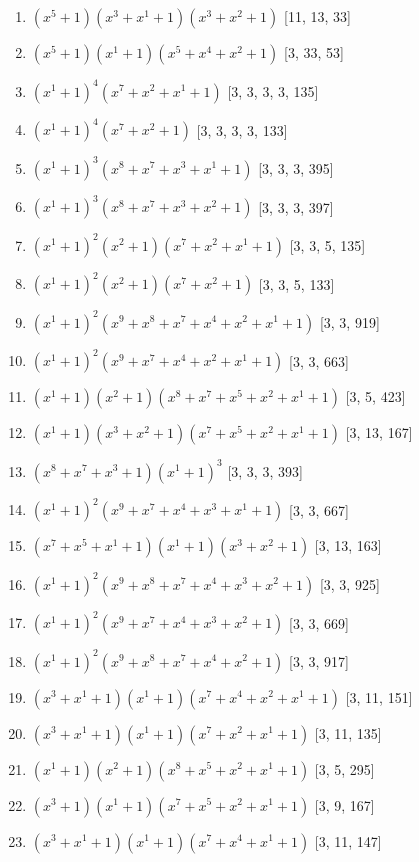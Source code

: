 \documentclass[10pt,twocolumn]{article}
\begin{document}
\begin{enumerate}
\item $(x^{5} + 1)(x^{3} + x^{1} + 1)(x^{3} + x^{2} + 1)$  [11, 13, 33]
\item $(x^{5} + 1)(x^{1} + 1)(x^{5} + x^{4} + x^{2} + 1)$  [3, 33, 53]
\item $(x^{1} + 1)^{4}(x^{7} + x^{2} + x^{1} + 1)$  [3, 3, 3, 3, 135]
\item $(x^{1} + 1)^{4}(x^{7} + x^{2} + 1)$  [3, 3, 3, 3, 133]
\item $(x^{1} + 1)^{3}(x^{8} + x^{7} + x^{3} + x^{1} + 1)$  [3, 3, 3, 395]
\item $(x^{1} + 1)^{3}(x^{8} + x^{7} + x^{3} + x^{2} + 1)$  [3, 3, 3, 397]
\item $(x^{1} + 1)^{2}(x^{2} + 1)(x^{7} + x^{2} + x^{1} + 1)$  [3, 3, 5, 135]
\item $(x^{1} + 1)^{2}(x^{2} + 1)(x^{7} + x^{2} + 1)$  [3, 3, 5, 133]
\item $(x^{1} + 1)^{2}(x^{9} + x^{8} + x^{7} + x^{4} + x^{2} + x^{1} + 1)$  [3, 3, 919]
\item $(x^{1} + 1)^{2}(x^{9} + x^{7} + x^{4} + x^{2} + x^{1} + 1)$  [3, 3, 663]
\item $(x^{1} + 1)(x^{2} + 1)(x^{8} + x^{7} + x^{5} + x^{2} + x^{1} + 1)$  [3, 5, 423]
\item $(x^{1} + 1)(x^{3} + x^{2} + 1)(x^{7} + x^{5} + x^{2} + x^{1} + 1)$  [3, 13, 167]
\item $(x^{8} + x^{7} + x^{3} + 1)(x^{1} + 1)^{3}$  [3, 3, 3, 393]
\item $(x^{1} + 1)^{2}(x^{9} + x^{7} + x^{4} + x^{3} + x^{1} + 1)$  [3, 3, 667]
\item $(x^{7} + x^{5} + x^{1} + 1)(x^{1} + 1)(x^{3} + x^{2} + 1)$  [3, 13, 163]
\item $(x^{1} + 1)^{2}(x^{9} + x^{8} + x^{7} + x^{4} + x^{3} + x^{2} + 1)$  [3, 3, 925]
\item $(x^{1} + 1)^{2}(x^{9} + x^{7} + x^{4} + x^{3} + x^{2} + 1)$  [3, 3, 669]
\item $(x^{1} + 1)^{2}(x^{9} + x^{8} + x^{7} + x^{4} + x^{2} + 1)$  [3, 3, 917]
\item $(x^{3} + x^{1} + 1)(x^{1} + 1)(x^{7} + x^{4} + x^{2} + x^{1} + 1)$  [3, 11, 151]
\item $(x^{3} + x^{1} + 1)(x^{1} + 1)(x^{7} + x^{2} + x^{1} + 1)$  [3, 11, 135]
\item $(x^{1} + 1)(x^{2} + 1)(x^{8} + x^{5} + x^{2} + x^{1} + 1)$  [3, 5, 295]
\item $(x^{3} + 1)(x^{1} + 1)(x^{7} + x^{5} + x^{2} + x^{1} + 1)$  [3, 9, 167]
\item $(x^{3} + x^{1} + 1)(x^{1} + 1)(x^{7} + x^{4} + x^{1} + 1)$  [3, 11, 147]

\end{enumerate}
\end{document}

